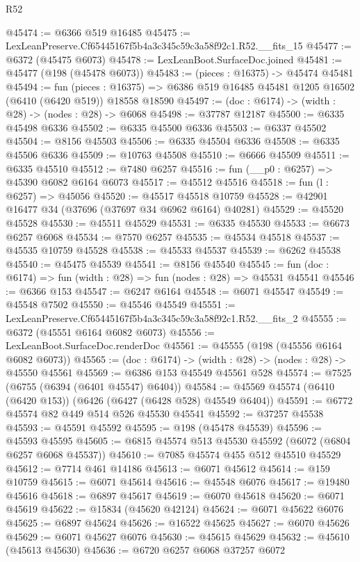 \begin{lexlean}{R52}
\begin{coremodule}
@45474 := @6366 @519 @16485
@45475 := LexLeanPreserve.Cf65445167f5b4a3c345c59c3a58f92c1.R52.__fits_15
@45477 := @6372 (@45475 @6073)
@45478 := LexLeanBoot.SurfaceDoc.joined
@45481 := @45477 (@198 (@45478 @6073))
@45483 := (pieces : @16375) -> @45474 @45481
@45494 := fun (pieces : @16375) =>
  @6386 @519 @16485 @45481 @1205 @16502 (@6410 (@6420 @519)) @18558 @18590
@45497 := (doc : @6174) -> (width : @28) -> (nodes : @28) -> @6068
@45498 := @37787 @12187
@45500 := @6335 @45498 @6336
@45502 := @6335 @45500 @6336
@45503 := @6337 @45502
@45504 := @8156 @45503
@45506 := @6335 @45504 @6336
@45508 := @6335 @45506 @6336
@45509 := @10763 @45508
@45510 := @6666 @45509
@45511 := @6335 @45510
@45512 := @7480 @6257
@45516 := fun (__p0 : @6257) => @45390 @6082 @6164 @6073
@45517 := @45512 @45516
@45518 := fun (l : @6257) => @45056
@45520 := @45517 @45518 @10759
@45528 := @42901 @16477 @34 (@37696 (@37697 @34 @6962 @6164) @40281)
@45529 := @45520 @45528
@45530 := @45511 @45529
@45531 := @6335 @45530
@45533 := @6673 @6257 @6068
@45534 := @7570 @6257
@45535 := @45534 @45518
@45537 := @45535 @10759 @45528
@45538 := @45533 @45537
@45539 := @6262 @45538
@45540 := @45475 @45539
@45541 := @8156 @45540
@45545 := fun (doc : @6174) => fun (width : @28) => fun (nodes : @28) => @45531 @45541
@45546 := @6366 @153
@45547 := @6247 @6164
@45548 := @6071 @45547
@45549 := @45548 @7502
@45550 := @45546 @45549
@45551 := LexLeanPreserve.Cf65445167f5b4a3c345c59c3a58f92c1.R52.__fits_2
@45555 := @6372 (@45551 @6164 @6082 @6073)
@45556 := LexLeanBoot.SurfaceDoc.renderDoc
@45561 := @45555 (@198 (@45556 @6164 @6082 @6073))
@45565 := (doc : @6174) -> (width : @28) -> (nodes : @28) -> @45550 @45561
@45569 := @6386 @153 @45549 @45561 @528
@45574 := @7525 (@6755 (@6394 (@6401 @45547) @6404))
@45584 := @45569 @45574 (@6410 (@6420 @153)) (@6426 (@6427 (@6428 @528) @45549 @6404))
@45591 := @6772 @45574 @82 @449 @514 @526 @45530 @45541
@45592 := @37257 @45538
@45593 := @45591 @45592
@45595 := @198 (@45478 @45539)
@45596 := @45593 @45595
@45605 := @6815 @45574 @513 @45530 @45592 (@6072 (@6804 @6257 @6068 @45537))
@45610 := @7085 @45574 @455 @512 @45510 @45529
@45612 := @7714 @461 @14186
@45613 := @6071 @45612
@45614 := @159 @10759
@45615 := @6071 @45614
@45616 := @45548 @6076
@45617 := @19480 @45616
@45618 := @6897 @45617
@45619 := @6070 @45618
@45620 := @6071 @45619
@45622 := @15834 (@45620 @42124)
@45624 := @6071 @45622 @6076
@45625 := @6897 @45624
@45626 := @16522 @45625
@45627 := @6070 @45626
@45629 := @6071 @45627 @6076
@45630 := @45615 @45629
@45632 := @45610 (@45613 @45630)
@45636 := @6720 @6257 @6068 @37257 @6072

\end{coremodule}
\end{lexlean}
